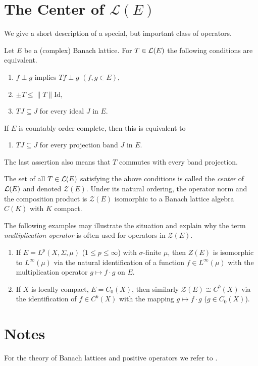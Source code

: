 \section{The Center of 
\texorpdfstring{$\mathcal{L}(E)$}{L(E)}}\label{sec:c1-9}
%
We give a short description of a special, but important class of operators.

Let $ E $ be a (complex) Banach lattice.
For $ T \in \mathcal{L}(E) $ the following conditions are equivalent.
\begin{enumerate}[\upshape (a)]

    \item 
    $ f \perp g $ implies $ Tf \perp g $ \quad $(f, g \in E)$,
    
    \item 
    $ \pm T \leq \|T\|\text{Id}$,
    
    \item 
    $ TJ \subseteq J $ for every ideal $ J $ in $ E $.
    
\end{enumerate}
If $ E $ is countably order complete, then this is equivalent to
\begin{enumerate}
    \item 
    $ TJ \subseteq J $ for every projection band $ J $ in $ E $.
\end{enumerate}
The last assertion also means that $ T $ commutes with every band projection.

The set of all $ T \in \mathcal{L}(E) $ satisfying the above conditions is called the \emph{center} of $ \mathcal{L}(E) $ and denoted 
$ \mathcal{Z}(E) $.
Under its natural ordering, the operator norm and the composition product is $ \mathcal{Z}(E) $ isomorphic to a Banach lattice algebra $ C(K) $ with $ K $ compact.

The following examples may illustrate the situation and explain why the term \emph{multiplication operator} is often used for operators in $ \mathcal{Z}(E) $.
\begin{enumerate}[\upshape (i), wide, labelindent=.5em]
\item 
If $ E = L^{p}(X,\Sigma,\mu) $ ($ 1 \leq p \leq \infty $) with $ \sigma $-finite $ \mu $, then $ Z(E) $ is isomorphic to $ L^{\infty}(\mu) $ via the natural identification of a function $ f \in L^{\infty}(\mu) $ with the multiplication operator $ g \mapsto f\cdot g $ on $ E $. 

\item 
If $ X $ is locally compact, $ E = C_{0}(X) $, then similarly $ \mathcal{Z}(E) \cong C^{b}(X) $ via the identification of $ f \in C^{b}(X) $ with the mapping $ g \mapsto f\cdot g $ ($ g \in C_{0}(X) $).
\end{enumerate}

\section*{Notes}

For the theory of Banach lattices and positive operators we refer to \citet{schaefer:1974}.

{\RaggedRight

}
